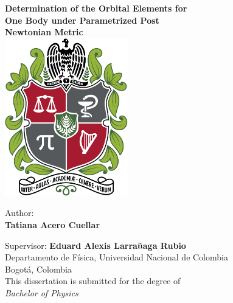  \begin{titlepage}
    \begin{center}
        \vspace*{0.1cm}
        
        {\Huge \textbf{Determination of the Orbital Elements for}} \\
           \vspace{0.20cm}
         {\Huge \textbf{One Body under Parametrized Post}}\\ 
            \vspace{0.15cm}
         {\Huge \textbf{Newtonian Metric}}\\
        
        \vspace{0.8cm}
        \includegraphics[width=0.4\textwidth]{Escudocolor.png}
        
        
         
        \vspace{0.8cm}
        \large Author: \\
        \vspace{0.3cm}
        \textbf{Tatiana Acero Cuellar}\\
        \vspace{1cm}
        
        Supervisor: \textbf{Eduard Alexis Larrañaga Rubio}\\
        
        
        \vspace{1.0cm}
        Departamento de Física, Universidad Nacional de Colombia \\
        Bogotá, Colombia\\
         \vspace{1.0cm}
         This dissertation is submitted for the degree of\\
         \textit{Bachelor of Physics}
        

\end{center}
\end{titlepage}
